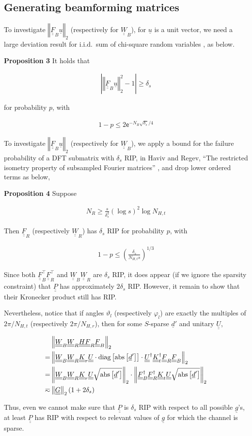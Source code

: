 \documentclass[journal]{IEEEtran}
\renewcommand {\d} {\delta}
\newcommand {\f} {\varphi}
\renewcommand {\th} {\vartheta}
\newcommand {\D} {\cdot}
\newcommand {\Tr} {\intercal}
\newcommand {\m} [1] {\( #1 \)}
\newcommand {\V} [1] {\underline {#1}}
\newcommand {\M} [1] {\underline {\underline {#1}}}
\newcommand {\RB} [1] {\left( #1 \right)}
\newcommand {\SB} [1] {\left[ #1 \right]}
\newcommand {\Nm} [1] {\left \vert #1 \right \vert}
\newcommand {\VNm} [1] {\left \Vert #1 \right \Vert}
\newcommand {\R} [1] {\sqrt {#1}}
\newcommand {\Disp} [1] {
   \begin {align*}
      #1
   \end {align*}
}
\begin{document}

\subsection {Generating beamforming matrices}

To investigate \m {\VNm {\M {F} _B \V {u}} _2} (respectively for \m {\M {W} _B}), for \m {\V {u}} is a unit vector, we need a large deviation result for i.i.d.\ sum of chi-square random variables \cite {LaM00}, as below.

\textbf {Proposition 3}
It holds that
%
\Disp {
\Nm {\VNm {\M {F} _B \V {u}} _2 ^2 - 1}
\geq \d_s 
}
for probability \m {p}, with
\Disp {
1 -p
\leq 2 \mathsf {e} ^{-N_R \R {\d_s} /4} 
}

To investigate \m {\VNm {\M {F} _B \V {u}} _2} (respectively for \m {\M {W} _B}), we apply a bound for the failure probability of a DFT submatrix with \m {\d_s} RIP, in Haviv and Regev, ``The restricted isometry property of subsampled Fourier matrices'' \cite {KlM17}, and drop lower ordered terms as below,

\textbf {Proposition 4}
Suppose
\Disp {
N_R
\geq \frac {s} {\d_s^2} \RB {\log s}^2 \log N_{H,t}
}
Then \m {\M {F}_R} (respectively \m {\M {W} _R}) has \m {\d_s} RIP for probability \m {p}, with
\Disp {
1 -p
\leq \RB {\frac {\d_s} {N_{H,t} s}} ^{1/3} 
}

Since both \m {\M {F}_B^\Tr \M {F}_R^\Tr} and \m {\M {W}_B \M {W}_R} are \m {\d_s} RIP, it does appear (if we ignore the sparsity constraint) that \m {\M {P}} has approximately \m {2\d_s} RIP.
However, it remain to show that their Kronecker product still has RIP.

Nevertheless, notice that if angles \m {\th_l} (respectively \m {\f_l}) are exactly the multiples of \m {2 \pi / N_{H,t}} (respectively \m {2 \pi / N_{H,r}}), then for some \m {S}-sparse \m {\V {d}'} and unitary \m {\M {U}},
\Disp {
&\VNm {\M {W} _B \M {W} _R \M {H} \M {F} _R \M {F} _B} _2 \notag \\
= &\VNm {
   \M {W} _B \M {W} _R \M {K} _r \M {U} \D
   \mathrm {diag} \SB {\mathrm {abs} \SB {\V {d}'}} \D
   \M {U} ^\dagger \M {K} _t ^\dagger \M {F} _R \M {F} _B} _2 \notag \\
= &\VNm {
   \M {W} _B \M {W} _R \M {K} _r \M {U}
   \R {\mathrm {abs} \SB {\V {d}'}}} _2 \D
   \VNm {\M {F} _B ^\dagger \M {F} _R ^\dagger \M {K} _t \M {U}
   \R {\mathrm {abs} \SB {\V {d}'}}} _2 \notag \\
\eqsim &\VNm {\M {G}} _2 \RB {1 +2\d_s} 
}
Thus, even we cannot make sure that \m {\M {P}} is \m {\d_s} RIP with respect to all possible \m {\V {g}}'s, at least \m {\M {P}} has RIP with respect to relevant values of \m {\V {g}} for which the channel is sparse.
\end{document}
